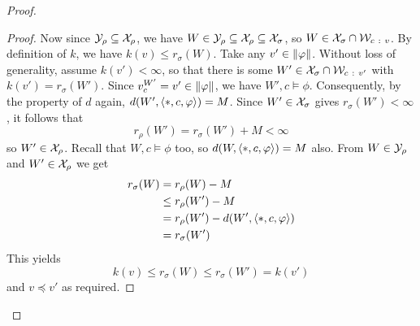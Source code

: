 \begin{proof}
\begin{proof}
            Now since $\mathcal{Y}_\rho \subseteq \mathcal{X}_\rho$, we have $W \in \mathcal{Y}_\rho
            \subseteq \mathcal{X}_\rho \subseteq \mathcal{X}_\sigma$, so $W \in \mathcal{X}_\sigma \cap
            \mathcal{W}_{c\ :\  v}$. By definition of $k$, we have $k(v) \le
            r_\sigma(W)$. Take any $v' \in \|{\varphi}\|$. Without loss of
            generality, assume $k(v') < \infty$, so that there is some $W' \in
            \mathcal{X}_\sigma \cap \mathcal{W}_{c\ :\  v'}$ with $k(v') = r_\sigma(W')$. Since
            $v^{W'}_c = v' \in \|{\varphi}\|$, we have $W', c \models \phi$.
            Consequently, by the property of $d$ again, $d(W', \langle {\ast, c,
            \varphi} \rangle) = M$. Since $W' \in \mathcal{X}_\sigma$ gives $r_\sigma(W') <
            \infty$, it follows that
            \[
                r_\rho(W') = r_\sigma(W') + M < \infty
            \]
            so $W' \in \mathcal{X}_\rho$.
            Recall that $W, c \models \phi$ too, so $d(W, \langle {\ast, c,
            \varphi} \rangle) = M$ also. From $W \in \mathcal{Y}_\rho$ and $W' \in \mathcal{X}_\rho$ we get
            \begin{align*}
                r_\sigma(W)
                &= r_\rho(W) - M \\
                &\le r_\rho(W') - M \\
                &= r_\rho(W') - d(W', \langle {\ast, c, \varphi} \rangle) \\
                &= r_\sigma(W')
            \end{align*}
            This yields
            \[
                k(v) \le r_\sigma(W) \le r_\sigma(W') = k(v')
            \]
            and $v \preceq v'$ as required.



\end{proof}
\end{proof}

